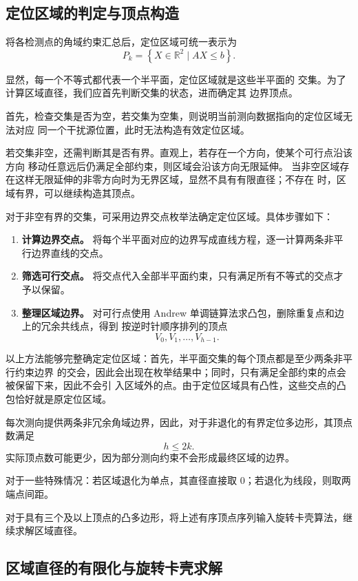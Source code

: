 \documentclass[withoutpreface,bwprint]{cumcmthesis} %
\begin{document}
\subsection{定位区域的判定与顶点构造}

将各检测点的角域约束汇总后，定位区域可统一表示为
\[
P_k=\left\{X\in\mathbb{R}^2\mid AX\le b\right\}.
\]

显然，每一个不等式都代表一个半平面，定位区域就是这些半平面的
交集。为了计算区域直径，我们应首先判断交集的状态，进而确定其
边界顶点。

首先，检查交集是否为空，若交集为空集，则说明当前测向数据指向的定位区域无法对应
同一个干扰源位置，此时无法构造有效定位区域。

若交集非空，还需判断其是否有界。直观上，若存在一个方向，使某个可行点沿该方向
移动任意远后仍满足全部约束，则区域会沿该方向无限延伸。
当非空区域存在这样无限延伸的非零方向时为无界区域，显然不具有有限直径；不存在
时，区域有界，可以继续构造其顶点。

对于非空有界的交集，可采用边界交点枚举法确定定位区域。具体步骤如下：

\begin{enumerate}
    \item \textbf{计算边界交点。}
    将每个半平面对应的边界写成直线方程，逐一计算两条非平行边界直线的交点。

    \item \textbf{筛选可行交点。}
    将交点代入全部半平面约束，只有满足所有不等式的交点才予以保留。

    \item \textbf{整理区域边界。}
    对可行点使用 Andrew 单调链算法求凸包，删除重复点和边上的冗余共线点，得到
    按逆时针顺序排列的顶点
    \[
    V_0,V_1,\ldots,V_{h-1}.
    \]
\end{enumerate}

以上方法能够完整确定定位区域：首先，半平面交集的每个顶点都是至少两条非平行约束边界
的交会，因此会出现在枚举结果中；同时，只有满足全部约束的点会被保留下来，因此不会引
入区域外的点。由于定位区域具有凸性，这些交点的凸包恰好就是原定位区域。

每次测向提供两条非冗余角域边界，因此，对于非退化的有界定位多边形，其顶点数满足
\[
h\le 2k.
\]
实际顶点数可能更少，因为部分测向约束不会形成最终区域的边界。

对于一些特殊情况：若区域退化为单点，其直径直接取 $0$；若退化为线段，则取两端点间距。

对于具有三个及以上顶点的凸多边形，将上述有序顶点序列输入旋转卡壳算法，继续求解区域直径。

\subsection{区域直径的有限化与旋转卡壳求解}
\end{document}
